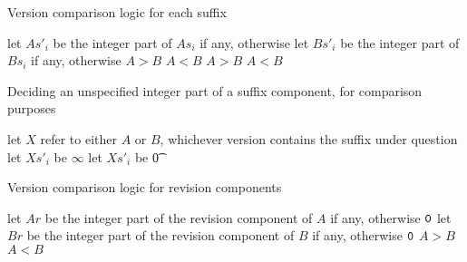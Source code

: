 \begin{algorithm}
\caption{Version comparison logic for each suffix} \label{alg:version-comparison-suffix-each}
\begin{algorithmic}[1]
    \STATE let $As'_i$ be the integer part of $As_i$ if any, otherwise 
    \STATE let $Bs'_i$ be the integer part of $Bs_i$ if any, otherwise 
      \RETURN $A>B$
      \RETURN $A<B$
    \ENDIF
    \RETURN $A>B$
  \ELSE
    \RETURN $A<B$
  \ENDIF
\end{algorithmic}
\end{algorithm}

\IFKDEBUILDELSE
{
  \begin{algorithm}
  \caption{Deciding an unspecified integer part of a suffix component, for comparison purposes} \label{alg:version-comparison-suffix-missingint}
  \begin{algorithmic}[1]
    \STATE let $X$ refer to either $A$ or $B$, whichever version contains the suffix under question
      \STATE let $Xs'_i$ be $\infty$
    \ELSE
      \STATE let $Xs'_i$ be \t{0}
    \ENDIF
  \end{algorithmic}
  \end{algorithm}
}{
}

\begin{algorithm}
\caption{Version comparison logic for revision components} \label{alg:version-comparison-revision}
\begin{algorithmic}[1]
  \STATE let $Ar$ be the integer part of the revision component of $A$ if any, otherwise $\texttt{0}$
  \STATE let $Br$ be the integer part of the revision component of $B$ if any, otherwise $\texttt{0}$
    \RETURN $A>B$
    \RETURN $A<B$
  \ENDIF
\end{algorithmic}
\end{algorithm}

